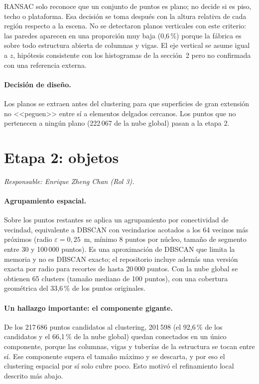 \documentclass[11pt,a4paper]{article}
\begin{document}
RANSAC solo reconoce que un conjunto de puntos es plano; no decide si es piso, techo o plataforma. Esa decisión se toma después con la altura relativa de cada región respecto a la escena. No se detectaron planos verticales con este criterio: las paredes aparecen en una proporción muy baja (0,6\,\%) porque la fábrica es sobre todo estructura abierta de columnas y vigas. El eje vertical se asume igual a $z$, hipótesis consistente con los histogramas de la sección~2 pero no confirmada con una referencia externa.

\paragraph{Decisión de diseño.} Los planos se extraen antes del clustering para que superficies de gran extensión no <<peguen>> entre sí a elementos delgados cercanos. Los puntos que no pertenecen a ningún plano (222\,067 de la nube global) pasan a la etapa 2.

\section{Etapa 2: objetos}
\textit{Responsable: Enrique Zheng Chan (Rol 3).}

\paragraph{Agrupamiento espacial.} Sobre los puntos restantes se aplica un agrupamiento por conectividad de vecindad, equivalente a DBSCAN con vecindarios acotados a los 64 vecinos más próximos (radio $\varepsilon=0{,}25$~m, mínimo 8 puntos por núcleo, tamaño de segmento entre 30 y 100\,000 puntos). Es una aproximación de DBSCAN que limita la memoria y no es DBSCAN exacto; el repositorio incluye además una versión exacta por radio para recortes de hasta 20\,000 puntos. Con la nube global se obtienen 65 clusters (tamaño mediano de 100 puntos), con una cobertura geométrica del 33,6\,\% de los puntos originales.

\paragraph{Un hallazgo importante: el componente gigante.}
De los 217\,686 puntos candidatos al clustering, 201\,598 (el 92,6\,\% de los candidatos y el 66,1\,\% de la nube global) quedan conectados en un único componente, porque las columnas, vigas y tuberías de la estructura se tocan entre sí. Ese componente supera el tamaño máximo y se descarta, y por eso el clustering espacial por sí solo cubre poco. Esto motivó el refinamiento local descrito más abajo.
\end{document}
